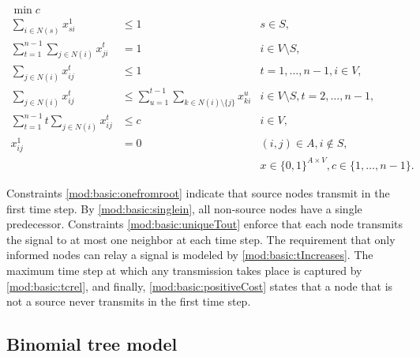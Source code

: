 \begin{subequations}\label{mod:basic}
\begin{align}
\label{mod:basic:obj} \min c \\ 
\label{mod:basic:onefromroot} \sum_{i \in N(s)}x^1_{si} & \leq 1 & s\in S,\\
\label{mod:basic:singlein} \sum\limits_{t=1}^{n-1}\sum\limits_{j\in N(i)}x_{ji}^t & = 1 & i\in V \setminus S,\\
\label{mod:basic:uniqueTout} \sum\limits_{j\in N(i)}x_{ij}^t & \leq 1  & t=1,\dots,n-1,i\in V,\\
\label{mod:basic:tIncreases} \sum\limits_{j\in N(i)}x_{ij}^t &\leq\sum\limits_{u=1}^{t-1}\sum\limits_{k\in N(i)\setminus\{j\}} x_{ki}^u  & i\in V\setminus S, t=2,\dots,n-1,\\
\label{mod:basic:tcrel} \sum\limits_{t=1}^{n-1}t\sum\limits_{j\in N(i)}x_{ij}^t & \leq c &  i\in V,\\
\label{mod:basic:positiveCost}x_{ij}^1 & = 0 & (i,j)\in A, i \not\in S,\\
\label{mod:basic:dim}&&x \in \{0,1\}^{A\times V}, c \in\{1,\dots,n-1\}.
\end{align}~
\end{subequations}

Constraints \eqref{mod:basic:onefromroot} indicate that source nodes transmit in the first time step.
By \eqref{mod:basic:singlein}, all non-source nodes have a single predecessor.
Constraints \eqref{mod:basic:uniqueTout} enforce that each node transmits the signal to at most one neighbor at each time step.
The requirement that only informed nodes can relay a signal is modeled by \eqref{mod:basic:tIncreases}. 
The maximum time step at which any transmission takes place is captured by \eqref{mod:basic:tcrel}, and finally, \eqref{mod:basic:positiveCost} states that a node that is not a source never transmits in the first time step.

\subsection{Binomial tree model}

